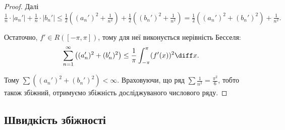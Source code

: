 \begin{proof}
    Далі
    \begin{equation}
        \tfrac{1}{n} \cdot |a_n'| + \tfrac{1}{n} \cdot |b_n'| \le \tfrac{1}{2} \left( (a_n')^2 + \tfrac{1}{n^2} \right) + \tfrac{1}{2} \left( (b_n')^2 + \tfrac{1}{n^2} \right) = \tfrac{1}{2} \left( (a_n')^2 + (b_n')^2 \right) + \tfrac{1}{n^2}.
    \end{equation}

    Остаточно, $f' \in R([-\pi, \pi])$, тому для неї виконується нерівність Бесселя:
    \begin{equation}
        \sum_{n = 1}^\infty \left( (a_n')^2 + (b_n')^2  \right) \le \frac{1}{\pi} \int_{-\pi}^\pi (f'(x))^2 \diff x.
    \end{equation}

    Тому $\sum \left( (a_n')^2 + (b_n')^2  \right) < \infty$. Враховуючи, що ряд $\sum \frac{1}{n^2} = \frac{\pi^2}{6}$, тобто також збіжний, отримуємо збіжність досліджуваного числового ряду.
\end{proof}

\subsection{Швидкість збіжності}

